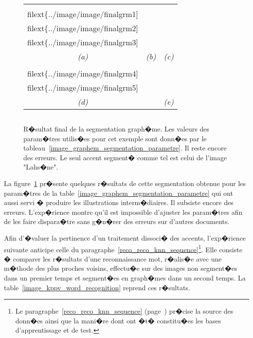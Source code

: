                                             
            \begin{figure}[t]
        $$\begin{tabular}{|c|c|c|} \hline
        \texttt{[image: \\filext\{../image/image/finalgrm1]}} &
        \texttt{[image: \\filext\{../image/image/finalgrm2]}} &
        \texttt{[image: \\filext\{../image/image/finalgrm3]}} \\
        \textit{(a)} & \textit{(b)} & \textit{(c)} \\ \hline
        \texttt{[image: \\filext\{../image/image/finalgrm4]}} & &
        \texttt{[image: \\filext\{../image/image/finalgrm5]}}  \\ 
        \textit{(d)} & & \textit{(e)}  \\ \hline
        \end{tabular}$$
        \caption{    R�sultat final de la segmentation graph�me. Les valeurs des param�tres utilis�es
                            pour cet exemple sont donn�es par le tableau~\ref{image_graphem_segmentation_parametre}.
                            Il reste encore des erreurs. Le seul accent segment� comme tel est celui de l'image "Lahs�ne".
                        }
        \label{image_graphem_resultat}
            \end{figure}


La figure~\ref{image_graphem_resultat} pr�sente quelques r�sultats de cette segmentation obtenue pour les param�tres de la table~\ref{image_graphem_segmentation_parametre} qui ont aussi servi � produire les illustrations interm�diaires. Il subsiste encore des erreurs. L'exp�rience montre qu'il est impossible d'ajuster les param�tres afin de les faire dispara�tre sans g�n�rer des erreurs sur d'autres documents.

Afin d'�valuer la pertinence d'un traitement dissoci� des accents, l'exp�rience suivante anticipe celle du paragraphe~\ref{reco_reco_knn_sequence}\footnote{Le paragraphe~\ref{reco_reco_knn_sequence} (page~\pageref{reco_reco_knn_sequence}) pr�cise la source des donn�es ainsi que la mani�re dont ont �t� constitu�es les bases d'apprentissage et de test.}. Elle consiste � comparer les r�sultats d'une reconnaissance mot, r�alis�e avec une m�thode des plus proches voisins, effectu�e sur des images non segment�es dans un premier temps et segment�es en graph�mes dans un second temps. La table~\ref{image_kppv_word_recognition} reprend ces r�sultats.




